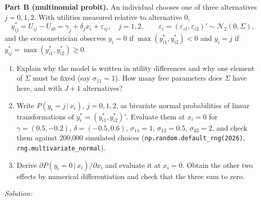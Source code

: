 \documentclass[11pt,a4paper]{article}
\newif\ifsolucoes
\newcommand{\espacoresol}{2.5cm}   %
\numberwithin{equation}{questao}
\newenvironment{enunciado}{\par\begingroup\small}{\endgroup\par}
\newcommand{\resolespaco}{\ifsolucoes\else\par\textit{Solution:}\vspace{\espacoresol}\par\fi}
\newcommand{\N}{\mathcal{N}}
\begin{document}
\begin{enunciado}
\textbf{Part B (multinomial probit).} An individual chooses one of three alternatives $j=0,1,2$. With utilities
measured relative to alternative 0,
\begin{equation*}
y_{ij}^*=U_{ij}-U_{i0}=\gamma_j+\delta_jx_i+\varepsilon_{ij},\quad j=1,2,\qquad
\varepsilon_i=(\varepsilon_{i1},\varepsilon_{i2})'\sim\N_2(0,\Sigma),
\end{equation*}
and the econometrician observes $y_i=0$ if $\max(y_{i1}^*,y_{i2}^*)<0$ and $y_i=j$ if $y_{ij}^*=\max(y_{i1}^*,y_{i2}^*)\ge0$.
\begin{enumerate}[label=(\roman*),leftmargin=2.4em,topsep=1pt,itemsep=1pt,start=5]
\item Explain why the model is written in utility differences and why one element of $\Sigma$ must be fixed (say
$\sigma_{11}=1$). How many free parameters does $\Sigma$ have here, and with $J+1$ alternatives?
\item Write $P(y_i=j\,|\,x_i)$, $j=0,1,2$, as bivariate normal probabilities of linear transformations of
$y_i^*=(y_{i1}^*,y_{i2}^*)'$. Evaluate them at $x_i=0$ for $\gamma=(0.5,-0.2)$, $\delta=(-0.5,0.6)$,
$\sigma_{11}=1$, $\sigma_{12}=0.5$, $\sigma_{22}=2$, and check them against 200{,}000 simulated choices
(\texttt{np.random.default\_rng(2026)}, \texttt{rng.multivariate\_normal}).
\item Derive $\partial P(y_i=0\,|\,x_i)/\partial x_i$ and evaluate it at $x_i=0$. Obtain the other two effects by
numerical differentiation and check that the three sum to zero.
\end{enumerate}
\end{enunciado}
\resolespaco
\end{document}
